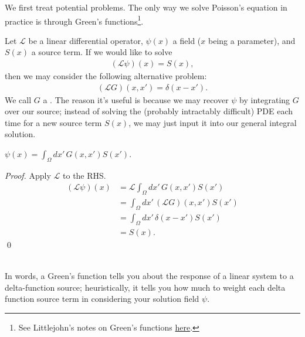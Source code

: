 \documentclass[11pt]{article}
\begin{document}
We first treat potential problems. The only way we solve Poisson's equation in 
practice is through Green's functions\footnote{See Littlejohn's notes on Green's functions 
\href{https://bohr.physics.berkeley.edu/classes/209/f02/green.pdf}{here}.}.
\begin{iidea}
    Let $\mathcal{L}$ be a linear differential operator, $\psi(x)$ a field ($x$
    being a parameter), and $S(x)$ a source term. If we would like to solve
    \begin{align*}
        (\mathcal{L} \psi)(x) = S(x),
    \end{align*}
    then we may consider the following alternative problem:
    \begin{align}
        (\mathcal{L}G)(x, x') = \delta(x - x').
        \label{greensFunc}
    \end{align}
    We call $G$ a . The reason it's
    useful is because we may recover $\psi$ by integrating
    $G$ over our source; instead of solving the (probably
    intractably difficult) PDE each time for a new source term $S(x)$,
    we may just input it into our general integral solution.
    \begin{claim}
        $\psi(x) = \int_{\Omega} dx' \, G(x, x') S(x')$.
    \end{claim}
    \begin{proof}
        Apply $\mathcal{L}$ to the RHS.
        \begin{align*}
            (\mathcal{L} \psi)(x)
            & = \mathcal{L} \int_{\Omega} dx' \, G(x, x') S(x')\\
            & = \int_{\Omega} dx' \, (\mathcal{L} G)(x, x') S(x')\\
            & = \int_{\Omega} dx' \, \delta(x - x') S(x')\\
            & = S(x).
        \end{align*}
        \qed
    \end{proof}\\
    In words, a Green's function tells you about the response of a linear system
    to a delta-function source; heuristically, it tells you how much
    to weight each delta function source term in considering your solution
    field $\psi$.
\end{iidea}
\end{document}
